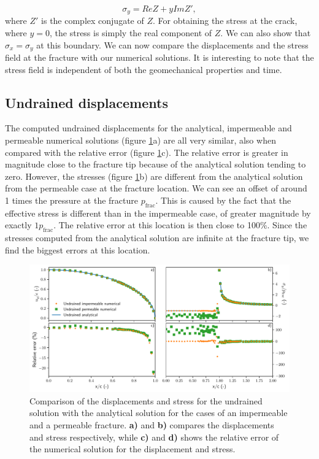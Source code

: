 \documentclass{article}
\begin{document}
\begin{equation}
\sigma_y = Re Z + y Im Z',
\end{equation}
where $Z'$ is the complex conjugate of $Z$. For obtaining the stress at the crack, where $y=0$, the stress is simply the real component of $Z$. We can also show that $\sigma_x=\sigma_y$ at this boundary. We can now compare the displacements and the stress field at the fracture with our numerical solutions. It is interesting to note that the stress field is independent of both the geomechanical properties and time.

\subsection{Undrained displacements}

The computed undrained displacements for the analytical, impermeable and permeable numerical solutions (figure \ref{fig:undrained}a) are all very similar, also when compared with the relative error (figure \ref{fig:undrained}c). The relative error is greater in magnitude close to the fracture tip because of the analytical solution tending to zero. However, the stresses (figure \ref{fig:undrained}b) are different from the analytical solution from the permeable case at the fracture location. We can see an offset of around 1 times the pressure at the fracture $p_{\text{frac}}$. This is caused by the fact that the effective stress is different than in the impermeable case, of greater magnitude by exactly $1p_{\text{frac}}$. The relative error at this location is then close to 100\%. Since the stresses computed from the analytical solution are infinite at the fracture tip, we find the biggest errors at this location.

\begin{figure}[h]
    \centering
    \includegraphics[width=1\textwidth]{../figures/undrained}
    \caption{Comparison of the displacements and stress for the undrained solution with the analytical solution for the cases of an impermeable and a permeable fracture. \textbf{a)} and \textbf{b)} compares the displacements and stress respectively, while \textbf{c)} and \textbf{d)} shows the relative error of the numerical solution for the displacement and stress.}
    \label{fig:undrained}
\end{figure}
\FloatBarrier
\end{document}

